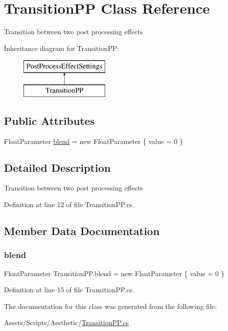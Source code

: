 \hypertarget{class_transition_p_p}{}\section{Transition\+PP Class Reference}
\label{class_transition_p_p}


Transition between two post processing effects  


Inheritance diagram for Transition\+PP\+:\begin{figure}[H]
\begin{center}
\leavevmode
\includegraphics[height=2.000000cm]{class_transition_p_p}
\end{center}
\end{figure}
\subsection*{Public Attributes}
\begin{DoxyCompactItemize}
\item 
Float\+Parameter \mbox{\hyperlink{class_transition_p_p_a9a6640794723ce393937e731893c9ab0}{blend}} = new Float\+Parameter \{ value = 0 \}
\end{DoxyCompactItemize}


\subsection{Detailed Description}
Transition between two post processing effects 



Definition at line 12 of file Transition\+P\+P.\+cs.



\subsection{Member Data Documentation}
\mbox{\label{class_transition_p_p_a9a6640794723ce393937e731893c9ab0}} 
\subsubsection{\texorpdfstring{blend}{blend}}
{\footnotesize\ttfamily Float\+Parameter Transition\+P\+P.\+blend = new Float\+Parameter \{ value = 0 \}}



Definition at line 15 of file Transition\+P\+P.\+cs.



The documentation for this class was generated from the following file\+:\begin{DoxyCompactItemize}
\item 
Assets/\+Scripts/\+Aesthetic/\mbox{\hyperlink{_transition_p_p_8cs}{Transition\+P\+P.\+cs}}\end{DoxyCompactItemize}
